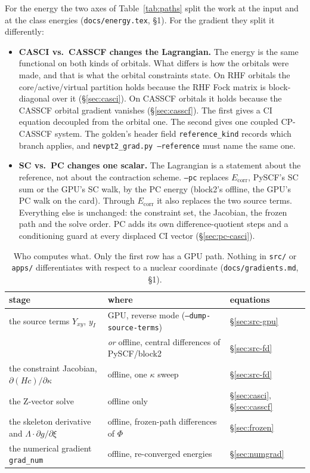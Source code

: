 \documentclass[11pt]{article}
\newcommand{\code}[1]{\texttt{#1}}
\newcommand{\Ecorr}{E_{\mathrm{corr}}}
\begin{document}
For the energy the two axes of Table~\ref{tab:paths} split the work at the
input and at the class energies (\code{docs/energy.tex},
\S1). For the gradient they split it differently:

\begin{itemize}
\item \textbf{CASCI vs.\ CASSCF changes the Lagrangian.} The energy is the same
  functional on both kinds of orbitals. What differs is how the orbitals were
  made, and that is what the orbital constraints state. On RHF orbitals the
  core/active/virtual partition holds because the RHF Fock matrix is
  block-diagonal over it (\S\ref{sec:casci}). On CASSCF orbitals it holds
  because the CASSCF orbital gradient vanishes (\S\ref{sec:casscf}). The
  first gives a CI equation decoupled from the orbital one. The second gives
  one coupled CP-CASSCF system. The golden's header field
  \code{reference\_kind} records which branch applies, and
  \code{nevpt2\_grad.py --reference} must name the same one.
\item \textbf{SC vs.\ PC changes one scalar.} The Lagrangian is a statement
  about the reference, not about the contraction scheme. \code{--pc}
  replaces $\Ecorr$, PySCF's SC sum or the GPU's SC walk, by the PC energy
  (block2's offline, the GPU's PC walk on the card). Through $\Ecorr$ it also
  replaces the two source terms. Everything else is unchanged: the constraint
  set, the Jacobian, the frozen path and the solve order. PC adds its own
  difference-quotient steps and a conditioning guard at every displaced CI
  vector (\S\ref{sec:pc-casci}).
\end{itemize}

\begin{table}[htbp]
\centering
\small
\begin{tabular}{@{}lll@{}}
\toprule
stage & where & equations \\
\midrule
the source terms $Y_{xy}$, $y_I$ & GPU, reverse mode (\code{--dump-source-terms}) & \S\ref{sec:src-gpu} \\
 & \emph{or} offline, central differences of PySCF/block2 & \S\ref{sec:src-fd} \\
the constraint Jacobian, $\partial(Hc)/\partial\kappa$ & offline, one $\kappa$ sweep & \S\ref{sec:src-fd} \\
the Z-vector solve & offline only & \S\ref{sec:casci}, \S\ref{sec:casscf} \\
the skeleton derivative and $\Lambda\cdot\partial g/\partial\xi$ & offline, frozen-path differences of $\Phi$ & \S\ref{sec:frozen} \\
the numerical gradient \code{grad\_num} & offline, re-converged energies & \S\ref{sec:numgrad} \\
\bottomrule
\end{tabular}
\caption{Who computes what. Only the first row has a GPU path. Nothing in
\code{src/} or \code{apps/} differentiates with respect to a nuclear
coordinate (\code{docs/gradients.md}, \S1).}
\label{tab:who}
\end{table}
\end{document}
